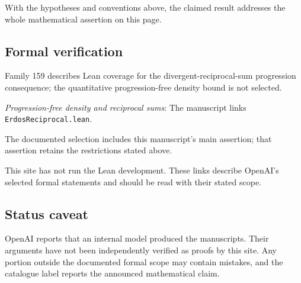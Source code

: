 \documentclass[11pt]{article}
\begin{document}
With the hypotheses and conventions above, the claimed result addresses the whole mathematical assertion on this page.

\subsection{Formal verification}
Family 159 describes Lean coverage for the divergent-reciprocal-sum progression consequence; the quantitative progression-free density bound is not selected.

\textit{Progression-free density and reciprocal sums}: The manuscript links \texttt{ErdosReciprocal.lean}.

The documented selection includes this manuscript’s main assertion; that assertion retains the restrictions stated above.

This site has not run the Lean development. These links describe OpenAI’s selected formal statements and should be read with their stated scope.

\subsection{Status caveat}
OpenAI reports that an internal model produced the manuscripts. Their arguments have not been independently verified as proofs by this site. Any portion outside the documented formal scope may contain mistakes, and the catalogue label reports the announced mathematical claim.
\end{document}
